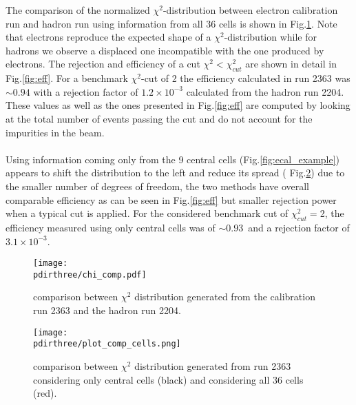 The comparison of the normalized $\chi^2$-distribution between
electron calibration run and hadron run using information from all 36
cells is shown in Fig.\ref{fig:chi2}. Note that electrons reproduce
the expected shape of a $\chi^2$-distribution while for hadrons we
observe a displaced one incompatible with the one produced by
electrons.  The rejection and efficiency of a cut
$\chi^2 < \chi^2_{cut}$ are shown in detail in Fig.\ref{fig:eff}. For
a benchmark $\chi^2$-cut of 2 the efficiency calculated in run 2363
was $\sim 0.94$ with a rejection factor of $1.2\times 10^{-3}$
calculated from the hadron run 2204. These values as well as the ones
presented in Fig.\ref{fig:eff} are computed by looking at the total
number of events passing the cut and do not account for the impurities
in the beam.
\\
\\
Using information coming only from the 9 central
cells (Fig.\ref{fig:ecal_example}) appears to shift the distribution
to the left and reduce its spread ( Fig.\ref{fig:chi}) due to the
smaller number of degrees of freedom, the two methods have overall
comparable efficiency as can be seen in Fig.\ref{fig:eff} but smaller
rejection power when a typical cut is applied.  For the considered
benchmark cut of $\chi^2_{cut}=$2, the efficiency measured using only
central cells was of $\sim 0.93$\ and a rejection factor of
$3.1\times 10^{-3}$.


\begin{figure}[h!]
  \begin{center}
    \texttt{[image: \\pdirthree/chi\_comp.pdf]}
  \end{center}
  \caption[comparison between $\chi^2$ distribution, electron and hadron calibration run]{comparison between $\chi^2$ distribution generated from the
    calibration run 2363 and the hadron run 2204.}
  \label{fig:chi2}
\end{figure}

\begin{figure}[h!]
  \begin{center}
    \texttt{[image: \\pdirthree/plot\_comp\_cells.png]}
  \end{center}
  \caption[comparison between $\chi^2$ distribution for different ECAL configurations]{comparison between $\chi^2$ distribution generated from run
    2363 considering only central cells (black) and considering all 36
    cells (red).}
  \label{fig:chi}
\end{figure}

